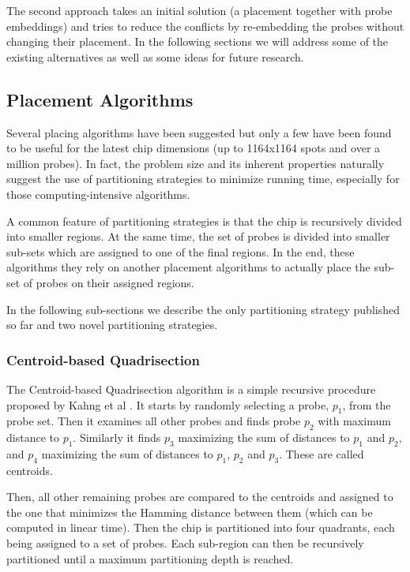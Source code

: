 \documentclass{article}
\begin{document}
The second approach takes an initial solution (a placement together with probe embeddings) and tries to reduce the conflicts by re-embedding the probes without changing their placement. In the following sections we will address some of the existing alternatives as well as some ideas for future research.

\subsection{Placement Algorithms}

Several placing algorithms have been suggested but only a few have been found to be useful for the latest chip dimensions (up to 1164x1164 spots and over a million probes). In fact, the problem size and its inherent properties naturally suggest the use of partitioning strategies to minimize running time, especially for those computing-intensive algorithms. 

A common feature of partitioning strategies is that the chip is recursively divided into smaller regions. At the same time, the set of probes is divided into smaller sub-sets which are assigned to one of the final regions. In the end, these algorithms they rely on another placement algorithms to actually place the sub-set of probes on their assigned regions. 

In the following sub-sections we describe the only partitioning strategy published so far and two novel partitioning strategies. 

\subsubsection{Centroid-based Quadrisection}

The Centroid-based Quadrisection algorithm is a simple recursive procedure proposed by Kahng et al \cite{KAHNG03B}. It starts by randomly selecting a probe, $p_1$, from the probe set. Then it examines all other probes and finds probe $p_2$ with maximum distance to $p_1$. Similarly it finds $p_3$ maximizing the sum of distances to $p_1$ and $p_2$, and $p_4$ maximizing the sum of distances to $p_1$, $p_2$ and $p_3$. These are called centroids. 

Then, all other remaining probes are compared to the centroids and assigned to the one that minimizes the Hamming distance between them (which can be computed in linear time). Then the chip is partitioned into four quadrants, each being assigned to a set of probes. Each sub-region can then be recursively partitioned until a maximum partitioning depth is reached. 
\end{document}
